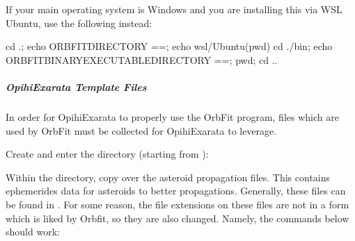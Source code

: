 \documentclass[letterpaper,11pt,english]{sphinxmanual}
\begin{document}
\begin{sphinxVerbatim}[commandchars=\\\{\}]
    
      
\end{sphinxVerbatim}

\sphinxAtStartPar
If your main operating system is Windows and you are installing this via WSL
Ubuntu, use the following instead:

\begin{sphinxVerbatim}[commandchars=\\\{\}]
cd .; echo \PYGZdq{}ORBFIT\PYGZus{}DIRECTORY ==\PYGZdq{}; echo \PYGZdq{}\PYGZbs{}\PYGZbs{}\PYGZbs{}\PYGZbs{}wsl\PYGZdl{}/Ubuntu\PYGZdq{}\PYGZdl{}(pwd)
cd ./bin; echo \PYGZdq{}ORBFIT\PYGZus{}BINARY\PYGZus{}EXECUTABLE\PYGZus{}DIRECTORY ==\PYGZdq{}; pwd; cd ..
\end{sphinxVerbatim}


\subparagraph{OpihiExarata Template Files}
\label{\detokenize{technical/installation/orbfit:opihiexarata-template-files}}
\sphinxAtStartPar
In order for OpihiExarata to properly use the OrbFit program, files which are
used by OrbFit must be collected for OpihiExarata to leverage.

\sphinxAtStartPar
Create and enter the directory (starting from ):

\begin{sphinxVerbatim}[commandchars=\\\{\}]
   
\end{sphinxVerbatim}

\sphinxAtStartPar
Within the  directory, copy over the asteroid propagation
files. This contains ephemerides data for asteroids to better propagations.
Generally, these files can be found in . For
some reason, the file extensions on these files are not in a form which is
liked by Orbfit, so they are also changed. Namely, the commands below should
work:
\end{document}
